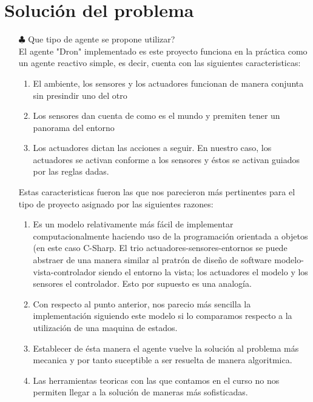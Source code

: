 \documentclass[10pt, a4paper]{article}
\begin{document}
\section{Solución del problema}
\begin{enumerate}
\item[$\clubsuit$]Que tipo de agente se propone utilizar?\\
El agente "Dron" implementado es este proyecto funciona en la práctica como un agente reactivo simple, es decir, cuenta con las siguientes caracteristicas: 
	\begin{enumerate}
	\item El ambiente, los sensores y los actuadores funcionan de manera conjunta sin presindir uno del otro
	\item Los sensores dan cuenta de como es el mundo y premiten tener un panorama del entorno 
	\item Los actuadores dictan las acciones a seguir. En nuestro caso, los actuadores se activan conforme a los sensores y éstos se activan guiados por las reglas dadas. 
\end{enumerate}

Estas caracteristicas fueron las que nos parecieron más pertinentes para el tipo de proyecto asignado por las siguientes razones: 
\begin{enumerate}
 \item Es un modelo relativamente más fácil de implementar computacionalmente haciendo uso de la programación orientada a objetos (en este caso C-Sharp. El trio actuadores-sensores-entornos se puede abstraer de una manera similar al pratrón de diseño de software modelo-vista-controlador siendo el entorno la vista; los actuadores el modelo y los sensores el controlador. Esto por supuesto es una analogía.
 
 \item Con respecto al punto anterior, nos parecio más sencilla la implementación siguiendo este modelo si lo comparamos respecto a la utilización de una maquina de estados. 
 
 \item Establecer de ésta manera el agente vuelve la solución al problema más mecanica y por tanto suceptible a ser resuelta de manera algoritmica.
 
 \item Las herramientas teoricas con las que contamos en el curso no nos permiten llegar a la solución de maneras más sofisticadas. 
 
\end{enumerate}
 


\end{enumerate}
\end{document}

